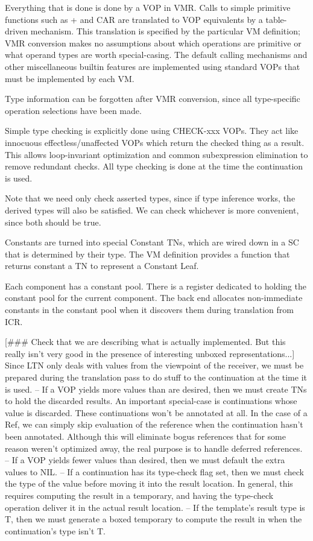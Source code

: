 Everything that is done is done by a VOP in VMR.  Calls to simple primitive
functions such as + and CAR are translated to VOP equivalents by a table-driven
mechanism.  This translation is specified by the particular VM definition; VMR
conversion makes no assumptions about which operations are primitive or what
operand types are worth special-casing.  The default calling mechanisms and
other miscellaneous builtin features are implemented using standard VOPs that
must be implemented by each VM.

Type information can be forgotten after VMR conversion, since all type-specific
operation selections have been made.

Simple type checking is explicitly done using CHECK-xxx VOPs.  They act like
innocuous effectless/unaffected VOPs which return the checked thing as a
result.  This allows loop-invariant optimization and common subexpression
elimination to remove redundant checks.  All type checking is done at the time
the continuation is used.

Note that we need only check asserted types, since if type inference works, the
derived types will also be satisfied.  We can check whichever is more
convenient, since both should be true.

Constants are turned into special Constant TNs, which are wired down in a SC
that is determined by their type.  The VM definition provides a function that
returns constant a TN to represent a Constant Leaf. 

Each component has a constant pool.  There is a register dedicated to holding
the constant pool for the current component.  The back end allocates
non-immediate constants in the constant pool when it discovers them during
translation from ICR.

[\#\#\# Check that we are describing what is actually implemented.  But this
really isn't very good in the presence of interesting unboxed
representations...] 
Since LTN only deals with values from the viewpoint of the receiver, we must be
prepared during the translation pass to do stuff to the continuation at the
time it is used.
 -- If a VOP yields more values than are desired, then we must create TNs to
    hold the discarded results.  An important special-case is continuations
    whose value is discarded.  These continuations won't be annotated at all.
    In the case of a Ref, we can simply skip evaluation of the reference when
    the continuation hasn't been annotated.  Although this will eliminate
    bogus references that for some reason weren't optimized away, the real
    purpose is to handle deferred references.
 -- If a VOP yields fewer values than desired, then we must default the extra
    values to NIL.
 -- If a continuation has its type-check flag set, then we must check the type
    of the value before moving it into the result location.  In general, this
    requires computing the result in a temporary, and having the type-check
    operation deliver it in the actual result location.
 -- If the template's result type is T, then we must generate a boxed
    temporary to compute the result in when the continuation's type isn't T.


